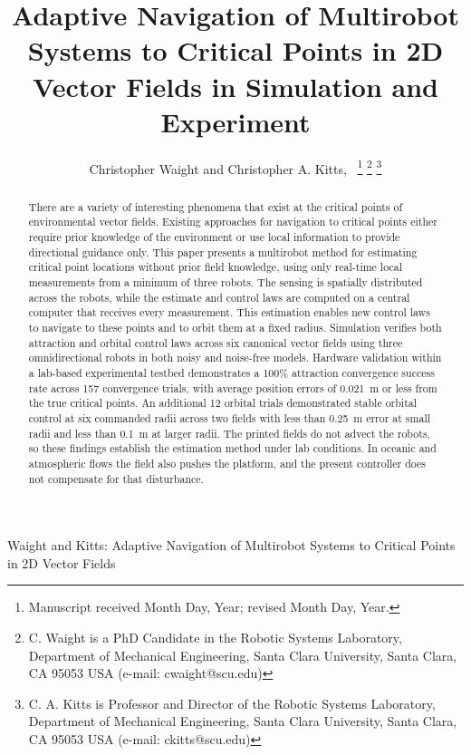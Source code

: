 \documentclass[lettersize,journal]{IEEEtran}
\begin{document}
\title{Adaptive Navigation of Multirobot Systems to Critical Points in 2D Vector Fields in Simulation and Experiment}
\author{Christopher Waight and Christopher A. Kitts,~
\thanks{Manuscript received Month Day, Year; revised Month Day, Year.}
\thanks{C. Waight is a PhD Candidate in the Robotic Systems Laboratory, Department of Mechanical Engineering, Santa Clara University, Santa Clara, CA 95053 USA (e-mail: cwaight@scu.edu)}
\thanks{C. A. Kitts is Professor and Director of the Robotic Systems Laboratory, Department of Mechanical Engineering, Santa Clara University, Santa Clara, CA 95053 USA (e-mail: ckitts@scu.edu)}
}
%
{Waight and Kitts: Adaptive Navigation of Multirobot Systems to Critical Points in 2D Vector Fields}


\maketitle

\begin{abstract}
    There are a variety of interesting phenomena that exist at the critical points of environmental vector fields. Existing approaches for navigation to critical points either require prior knowledge of the environment or use local information to provide directional guidance only. This paper presents a multirobot method for estimating critical point locations without prior field knowledge, using only real-time local measurements from a minimum of three robots. The sensing is spatially distributed across the robots, while the estimate and control laws are computed on a central computer that receives every measurement.
    This estimation enables new control laws to navigate to these points and to orbit them at a fixed radius.
    Simulation verifies both attraction and orbital control laws across six canonical vector fields using three omnidirectional robots in both noisy and noise-free models. Hardware validation within a lab-based experimental testbed demonstrates a 100\% attraction convergence success rate across 157 convergence trials, with average position errors of 0.021~m or less from the true critical points. An additional 12 orbital trials demonstrated stable orbital control at six commanded radii across two fields with less than 0.25~m error at small radii and less than 0.1~m at larger radii. The printed fields do not advect the robots, so these findings establish the estimation method under lab conditions. In oceanic and atmospheric flows the field also pushes the platform, and the present controller does not compensate for that disturbance.  

\end{abstract}
\end{document}
